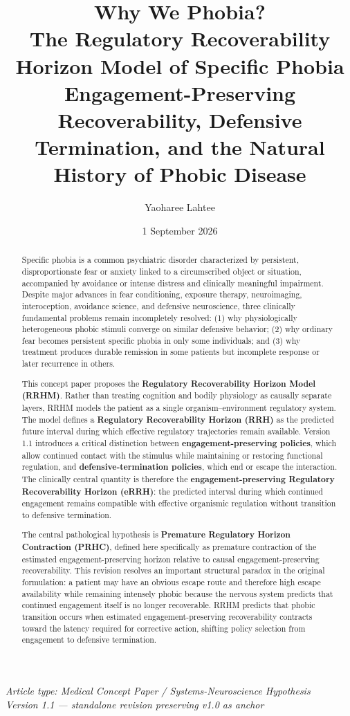 \documentclass[11pt]{article}
\title{\textbf{Why We Phobia?}\\[0.4em]
\large The Regulatory Recoverability Horizon Model of Specific Phobia\\[0.25em]
\normalsize Engagement-Preserving Recoverability, Defensive Termination, and the Natural History of Phobic Disease}
\author{Yaoharee Lahtee}
\date{1 September 2026}
\begin{document}
\maketitle

\begin{center}
\textit{Article type: Medical Concept Paper / Systems-Neuroscience Hypothesis}\\
\textit{Version 1.1 --- standalone revision preserving v1.0 as anchor}
\end{center}

\begin{abstract}
Specific phobia is a common psychiatric disorder characterized by persistent, disproportionate fear or anxiety linked to a circumscribed object or situation, accompanied by avoidance or intense distress and clinically meaningful impairment. Despite major advances in fear conditioning, exposure therapy, neuroimaging, interoception, avoidance science, and defensive neuroscience, three clinically fundamental problems remain incompletely resolved: (1) why physiologically heterogeneous phobic stimuli converge on similar defensive behavior; (2) why ordinary fear becomes persistent specific phobia in only some individuals; and (3) why treatment produces durable remission in some patients but incomplete response or later recurrence in others.

This concept paper proposes the \textbf{Regulatory Recoverability Horizon Model (RRHM)}. Rather than treating cognition and bodily physiology as causally separate layers, RRHM models the patient as a single organism--environment regulatory system. The model defines a \textbf{Regulatory Recoverability Horizon (RRH)} as the predicted future interval during which effective regulatory trajectories remain available. Version 1.1 introduces a critical distinction between \textbf{engagement-preserving policies}, which allow continued contact with the stimulus while maintaining or restoring functional regulation, and \textbf{defensive-termination policies}, which end or escape the interaction. The clinically central quantity is therefore the \textbf{engagement-preserving Regulatory Recoverability Horizon (eRRH)}: the predicted interval during which continued engagement remains compatible with effective organismic regulation without transition to defensive termination.

The central pathological hypothesis is \textbf{Premature Regulatory Horizon Contraction (PRHC)}, defined here specifically as premature contraction of the estimated engagement-preserving horizon relative to causal engagement-preserving recoverability. This revision resolves an important structural paradox in the original formulation: a patient may have an obvious escape route and therefore high escape availability while remaining intensely phobic because the nervous system predicts that continued engagement itself is no longer recoverable. RRHM predicts that phobic transition occurs when estimated engagement-preserving recoverability contracts toward the latency required for corrective action, shifting policy selection from engagement to defensive termination.


\end{abstract}
\end{document}
